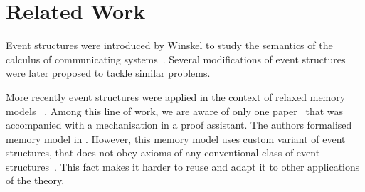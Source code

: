 \section{Related Work}


Event structures were introduced by Winskel to study the semantics of 
the calculus of communicating systems~\cite{Winskel:82}. 
Several modifications of event structures~\cite{Langerak:91, Boudol-Castellani:1991}
were later proposed to tackle similar problems.  
 
More recently event structures were applied 
in the context of relaxed memory models~%
\cite{Jeffrey-Riely:LICS16, PichonPharabod-Sewell:POPL16, Chakraborty-Vafeiadis:POPL19, Moiseenko-al:ECOOP20}.
Among this line of work, we are aware of only one paper~\cite{Moiseenko-al:ECOOP20}
that was accompanied with a mechanisation in a proof assistant. 
The authors formalised \weakestmo~\cite{Chakraborty-Vafeiadis:POPL19} 
memory model in \coq. However, this memory model uses 
custom variant of event structures, that does not 
obey axioms of any conventional class of 
event structures~\cite{Winskel:82, Langerak:91, Boudol-Castellani:1991}. 
This fact makes it harder to reuse and adapt it 
to other applications of the theory. 


